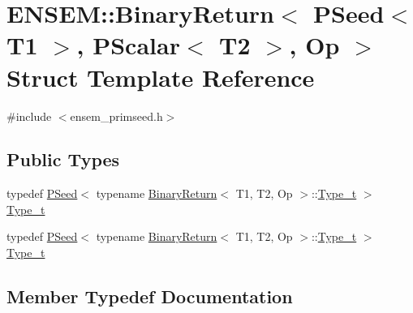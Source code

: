 \hypertarget{structENSEM_1_1BinaryReturn_3_01PSeed_3_01T1_01_4_00_01PScalar_3_01T2_01_4_00_01Op_01_4}{}\section{E\+N\+S\+EM\+:\+:Binary\+Return$<$ P\+Seed$<$ T1 $>$, P\+Scalar$<$ T2 $>$, Op $>$ Struct Template Reference}
\label{structENSEM_1_1BinaryReturn_3_01PSeed_3_01T1_01_4_00_01PScalar_3_01T2_01_4_00_01Op_01_4}


{\ttfamily \#include $<$ensem\+\_\+primseed.\+h$>$}

\subsection*{Public Types}
\begin{DoxyCompactItemize}
\item 
typedef \mbox{\hyperlink{classENSEM_1_1PSeed}{P\+Seed}}$<$ typename \mbox{\hyperlink{structENSEM_1_1BinaryReturn}{Binary\+Return}}$<$ T1, T2, Op $>$\+::\mbox{\hyperlink{structENSEM_1_1BinaryReturn_3_01PSeed_3_01T1_01_4_00_01PScalar_3_01T2_01_4_00_01Op_01_4_a4130a6d592ca5e069c711c81b422aa54}{Type\+\_\+t}} $>$ \mbox{\hyperlink{structENSEM_1_1BinaryReturn_3_01PSeed_3_01T1_01_4_00_01PScalar_3_01T2_01_4_00_01Op_01_4_a4130a6d592ca5e069c711c81b422aa54}{Type\+\_\+t}}
\item 
typedef \mbox{\hyperlink{classENSEM_1_1PSeed}{P\+Seed}}$<$ typename \mbox{\hyperlink{structENSEM_1_1BinaryReturn}{Binary\+Return}}$<$ T1, T2, Op $>$\+::\mbox{\hyperlink{structENSEM_1_1BinaryReturn_3_01PSeed_3_01T1_01_4_00_01PScalar_3_01T2_01_4_00_01Op_01_4_a4130a6d592ca5e069c711c81b422aa54}{Type\+\_\+t}} $>$ \mbox{\hyperlink{structENSEM_1_1BinaryReturn_3_01PSeed_3_01T1_01_4_00_01PScalar_3_01T2_01_4_00_01Op_01_4_a4130a6d592ca5e069c711c81b422aa54}{Type\+\_\+t}}
\end{DoxyCompactItemize}


\subsection{Member Typedef Documentation}
\mbox{\label{structENSEM_1_1BinaryReturn_3_01PSeed_3_01T1_01_4_00_01PScalar_3_01T2_01_4_00_01Op_01_4_a4130a6d592ca5e069c711c81b422aa54}} 
